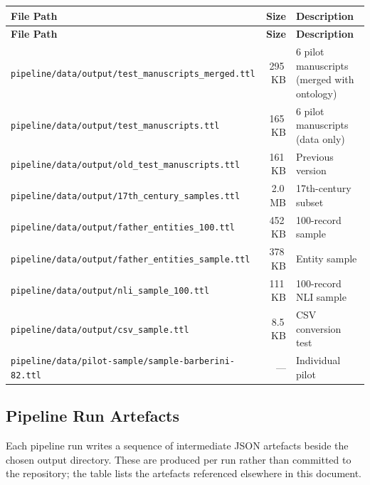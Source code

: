 \documentclass[12pt]{article}
\newcommand{\filepath}[1]{\texttt{\small #1}}
\begin{document}
\begin{longtable}{|p{9cm}|r|p{3cm}|}
\hline
\textbf{File Path} & \textbf{Size} & \textbf{Description} \\
\hline
\endfirsthead
\hline
\textbf{File Path} & \textbf{Size} & \textbf{Description} \\
\hline
\endhead
\hline
\endfoot
\filepath{pipeline/data/output/test\_manuscripts\_merged.ttl} & 295\,KB & 6 pilot manuscripts (merged with ontology) \\
\hline
\filepath{pipeline/data/output/test\_manuscripts.ttl} & 165\,KB & 6 pilot manuscripts (data only) \\
\hline
\filepath{pipeline/data/output/old\_test\_manuscripts.ttl} & 161\,KB & Previous version \\
\hline
\filepath{pipeline/data/output/17th\_century\_samples.ttl} & 2.0\,MB & 17th-century subset \\
\hline
\filepath{pipeline/data/output/father\_entities\_100.ttl} & 452\,KB & 100-record sample \\
\hline
\filepath{pipeline/data/output/father\_entities\_sample.ttl} & 378\,KB & Entity sample \\
\hline
\filepath{pipeline/data/output/nli\_sample\_100.ttl} & 111\,KB & 100-record NLI sample \\
\hline
\filepath{pipeline/data/output/csv\_sample.ttl} & 8.5\,KB & CSV conversion test \\
\hline
\filepath{pipeline/data/pilot-sample/sample-barberini-82.ttl} & --- & Individual pilot \\
\hline
\end{longtable}

\subsection{Pipeline Run Artefacts}

Each pipeline run writes a sequence of intermediate JSON artefacts beside the chosen output directory. These are produced per run rather than committed to the repository; the table lists the artefacts referenced elsewhere in this document.
\end{document}
